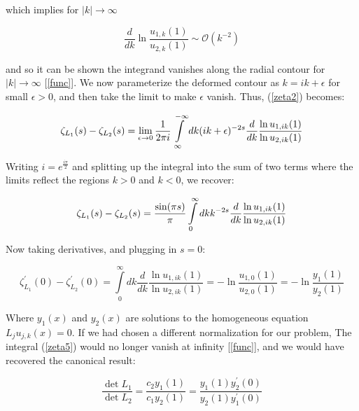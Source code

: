\documentclass[12]{article}
\begin{document}
which implies for \(|k| \longrightarrow  \infty\) 

\begin{equation} \label{eigvalprob}
   \frac{d}{dk}\ln{\frac{u_{1,k}(1)}{u_{2,k}(1)}} \sim \mathcal{O}(k^{-2})
\end{equation} 

and so it can be shown the integrand vanishes along the radial contour for \(|k| \longrightarrow  \infty\) [\ref{func}]. We now parameterize the deformed contour as \( k = ik + \epsilon\) for small \(\epsilon > 0\), and then take the limit to make \(\epsilon\) vanish. Thus, (\ref{zeta2}) becomes:

\begin{equation} \label{zeta3}
    \zeta_{L_1}(s) -  \zeta_{L_2}(s) = \lim_{\epsilon\to0} \frac{1}{2 \pi i} \int\limits_{\infty}^{-\infty}dk (ik + \epsilon)^{-2s} \frac{d}{dk} \frac{\ln{u_{1,ik}(1)}}{\ln{u_{2,ik}(1)}} \\
\end{equation} 

Writing \( i = e^{\frac{i\pi}{2}} \) and splitting up the integral into the sum of two terms where the limits reflect the regions \(k > 0\) and \(k < 0\), we recover:

\begin{equation} \label{zeta4}
    \zeta_{L_1}(s) -  \zeta_{L_2}(s) = \frac{\sin(\pi s)}{\pi} \int\limits_{0}^{\infty}dk k^{-2s} \frac{d}{dk} \frac{\ln{u_{1,ik}(1)}}{\ln{u_{2,ik}(1)}} \\
\end{equation} 

Now taking derivatives, and plugging in \(s = 0\):

\begin{equation} \label{zeta5}
    \zeta^{'}_{L_1}(0) -  \zeta^{'}_{L_2}(0) = \int\limits_{0}^{\infty}dk \frac{d}{dk} \frac{\ln{u_{1,ik}(1)}}{\ln{u_{2,ik}(1)}} = -\ln{\frac{u_{1,0}(1)}{u_{2,0}(1)}} = -\ln{\frac{y_1(1)}{y_2(1)}}
\end{equation} 

Where \(y_1(x)\) and \(y_2(x)\) are solutions to the homogeneous equation \( L_j u_{j,k}(x) = 0 \). If we had chosen a different normalization for our problem, The integral (\ref{zeta5}) would no longer vanish at infinity [\ref{func}], and we would have recovered the canonical result:

\begin{equation} \label{solution}
    \frac{\det{L_1}}{\det{L_2}} = \frac{c_2y_1(1)}{c_1y_2(1)} = \frac{y_1(1)y^{'}_2(0)}{y_2(1)y^{'}_1(0)}
\end{equation} 
\end{document}
